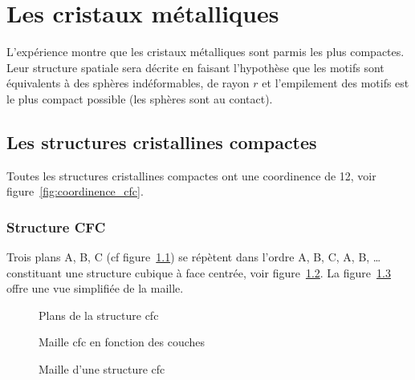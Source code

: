 \chapter{Les cristaux métalliques}
L'expérience montre que les cristaux métalliques sont parmis les plus
compactes. Leur structure spatiale sera décrite en faisant l'hypothèse
que les motifs sont équivalents à des sphères indéformables, de rayon
$r$ et l'empilement des motifs est le plus compact possible (les
sphères sont au contact).

\section{Les structures cristallines compactes}
Toutes les structures cristallines compactes ont une coordinence de
12, voir figure~\ref{fig:coordinence_cfc}.
\subsection{Structure CFC}
Trois plans A, B, C (cf figure~\ref{fig:plans_métal}) se répètent
dans l'ordre A, B, C, A, B, \dots constituant une structure cubique à face
centrée, voir figure~\ref{fig:maille_métal_couches}.
La figure~\ref{fig:maille_cfc} offre une vue simplifiée de la maille.
\begin{figure}
    \centering
    \qquad
    \qquad
    \caption{Plans de la structure cfc}\label{fig:plans_métal}
\end{figure}
\begin{figure}
    \centering
    \qquad
    \caption{Maille cfc
    en fonction des couches}\label{fig:maille_métal_couches}
\end{figure}
\begin{figure}
    \centering
    
    \caption{Maille d'une structure cfc}\label{fig:maille_cfc}
\end{figure}

